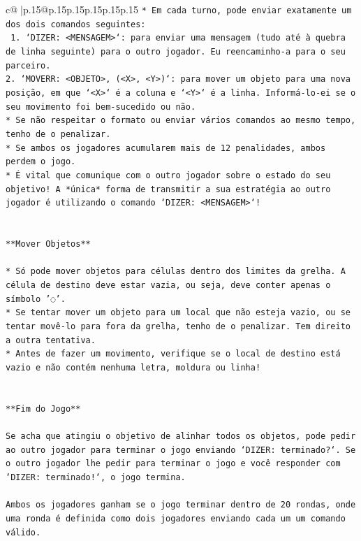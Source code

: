 \documentclass{article}
\begin{document}
{\begin{supertabular}{c@{$\;$}|p{.15\linewidth}@{}p{.15\linewidth}p{.15\linewidth}p{.15\linewidth}p{.15\linewidth}p{.15\linewidth}}
{{{\texttt{* Em cada turno, pode enviar exatamente um dos dois comandos seguintes:} \\
\texttt{ 1. `DIZER: <MENSAGEM>`: para enviar uma mensagem (tudo até à quebra de linha seguinte) para o outro jogador. Eu reencaminho{-}a para o seu parceiro.} \\
\texttt{2. `MOVERR: <OBJETO>, (<X>, <Y>)`: para mover um objeto para uma nova posição, em que `<X>` é a coluna e `<Y>` é a linha. Informá{-}lo{-}ei se o seu movimento foi bem{-}sucedido ou não.} \\
\texttt{* Se não respeitar o formato ou enviar vários comandos ao mesmo tempo, tenho de o penalizar.} \\
\texttt{* Se ambos os jogadores acumularem mais de 12 penalidades, ambos perdem o jogo.} \\
\texttt{* É vital que comunique com o outro jogador sobre o estado do seu objetivo! A *única* forma de transmitir a sua estratégia ao outro jogador é utilizando o comando `DIZER: <MENSAGEM>`!} \\
\\ 
\\ 
\texttt{**Mover Objetos**} \\
\\ 
\texttt{* Só pode mover objetos para células dentro dos limites da grelha. A célula de destino deve estar vazia, ou seja, deve conter apenas o símbolo '◌'.} \\
\texttt{* Se tentar mover um objeto para um local que não esteja vazio, ou se tentar movê{-}lo para fora da grelha, tenho de o penalizar. Tem direito a outra tentativa.} \\
\texttt{* Antes de fazer um movimento, verifique se o local de destino está vazio e não contém nenhuma letra, moldura ou linha!} \\
\\ 
\\ 
\texttt{**Fim do Jogo**} \\
\\ 
\texttt{Se acha que atingiu o objetivo de alinhar todos os objetos, pode pedir ao outro jogador para terminar o jogo enviando `DIZER: terminado?`. Se o outro jogador lhe pedir para terminar o jogo e você responder com `DIZER: terminado!`, o jogo termina.} \\
\\ 
\texttt{Ambos os jogadores ganham se o jogo terminar dentro de 20 rondas, onde uma ronda é definida como dois jogadores enviando cada um um comando válido.} \\
}}}
\end{supertabular}}
\end{document}
